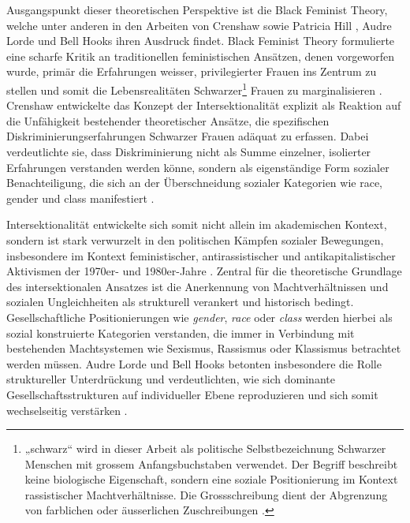 Ausgangspunkt dieser theoretischen Perspektive ist die Black Feminist Theory, welche unter anderen in den Arbeiten von Crenshaw sowie Patricia Hill \textcite{collinsBlackFeministThought2002}, Audre Lorde und Bell Hooks ihren Ausdruck findet. Black Feminist Theory formulierte eine scharfe Kritik an traditionellen feministischen Ansätzen, denen vorgeworfen wurde, primär die Erfahrungen weisser, privilegierter Frauen ins Zentrum zu stellen und somit die Lebensrealitäten Schwarzer\footnote{„\gls{schwarz}“ wird in dieser Arbeit als politische Selbstbezeichnung Schwarzer Menschen mit grossem Anfangsbuchstaben verwendet. Der Begriff beschreibt keine biologische Eigenschaft, sondern eine soziale Positionierung im Kontext rassistischer Machtverhältnisse. Die Grossschreibung dient der Abgrenzung von farblichen oder äusserlichen Zuschreibungen \parencite[vgl.][]{oguntoyeFarbeBekennenAfrodeutsche1986}.} Frauen zu marginalisieren \parencite{collinsBlackFeministThought2002}. Crenshaw entwickelte das Konzept der Intersektionalität explizit als Reaktion auf die Unfähigkeit bestehender theoretischer Ansätze, die spezifischen Diskriminierungserfahrungen Schwarzer Frauen adäquat zu erfassen. Dabei verdeutlichte sie, dass Diskriminierung nicht als Summe einzelner, isolierter Erfahrungen verstanden werden könne, sondern als eigenständige Form sozialer Benachteiligung, die sich an der Überschneidung sozialer Kategorien wie \gls{race}, \gls{gender} und \gls{class} manifestiert \parencite{crenshawMappingMarginsIntersectionality1991}.

Intersektionalität entwickelte sich somit nicht allein im akademischen Kontext, sondern ist stark verwurzelt in den politischen Kämpfen sozialer Bewegungen, insbesondere im Kontext feministischer, antirassistischer und antikapitalistischer Aktivismen der 1970er- und 1980er-Jahre \parencite{collinsBlackFeministThought2002}. Zentral für die theoretische Grundlage des intersektionalen Ansatzes ist die Anerkennung von Machtverhältnissen und sozialen Ungleichheiten als strukturell verankert und historisch bedingt. Gesellschaftliche Positionierungen wie \textit{gender}, \textit{race} oder \textit{class} werden hierbei als sozial konstruierte Kategorien verstanden, die immer in Verbindung mit bestehenden Machtsystemen wie Sexismus, Rassismus oder Klassismus betrachtet werden müssen. Audre Lorde und Bell Hooks betonten insbesondere die Rolle struktureller Unterdrückung und verdeutlichten, wie sich dominante Gesellschaftsstrukturen auf individueller Ebene reproduzieren und sich somit wechselseitig verstärken \parencite{collinsBlackFeministThought2002, hancockWhenMultiplicationDoesnt2007}.

